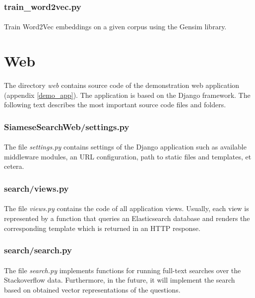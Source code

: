 \subsubsection{train\_word2vec.py}
\paragraph{}
Train Word2Vec embeddings on a given corpus using the Gensim library.

\section{Web}
\paragraph{}
The directory \textit{web} contains source code of the demonstration web application (appendix \ref{demo_app}). The application is based on the Django framework. The following text describes the most important source code files and folders.

\subsubsection{SiameseSearchWeb/settings.py}
\paragraph{}
The file \textit{settings.py} contains settings of the Django application such as available middleware modules, an URL configuration, path to static files and templates, et cetera.

\subsubsection{search/views.py}
\paragraph{}
The file \textit{views.py} contains the code of all application views. Usually, each view is represented by a function that queries an Elasticsearch database and renders the corresponding template which is returned in an HTTP response.

\subsubsection{search/search.py}
\paragraph{}
The file \textit{search.py} implements functions for running full-text searches over the Stackoverflow data. Furthermore, in the future, it will implement the search based on obtained vector representations of the questions.

